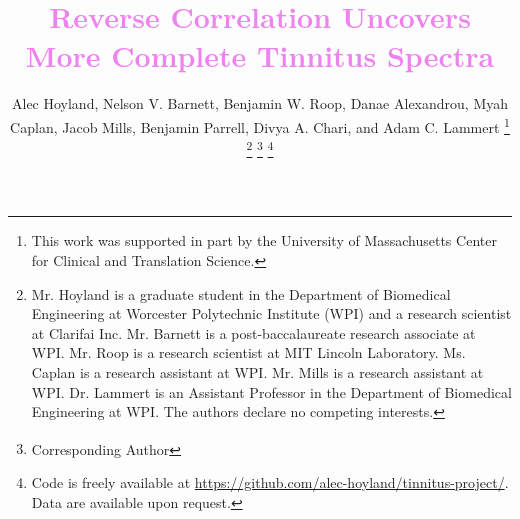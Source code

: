 \documentclass[journal]{IEEEtran}
\begin{document}
%
\title{\textcolor{violet}{Reverse Correlation Uncovers More Complete Tinnitus Spectra \vspace{0.25cm}}}

%
%
%

\author{Alec Hoyland, Nelson V. Barnett, Benjamin W. Roop, Danae Alexandrou, Myah Caplan, Jacob Mills, Benjamin Parrell, Divya A. Chari, and Adam C. Lammert\textsuperscript{\textdagger{}}%
\thanks{This work was supported in part by the University of Massachusetts
Center for Clinical and Translation Science.}%
\thanks{Mr. Hoyland is a graduate student in the Department of Biomedical Engineering
at Worcester Polytechnic Institute (WPI) and a research scientist at Clarifai Inc.
Mr. Barnett is a post-baccalaureate research associate at WPI.
Mr. Roop is a research scientist at MIT Lincoln Laboratory.
Ms. Caplan is a research assistant at WPI.
Mr. Mills is a research assistant at WPI.
Dr. Lammert is an Assistant Professor in the Department of Biomedical Engineering at WPI.
The authors declare no competing interests.}%
\thanks{\textsuperscript{\textdagger{}} Corresponding Author}%
\thanks{Code is freely available at \protect\url{https://github.com/alec-hoyland/tinnitus-project/}.
Data are available upon request.}}
\end{document}

